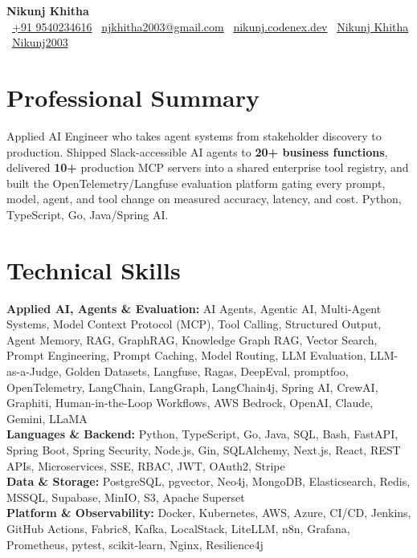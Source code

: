 \documentclass[letterpaper,10pt]{article}
\begin{document}
\begin{center}
  {\Huge \textbf{Nikunj Khitha}}\\
  \vspace{2pt}
  \small
  ~\href{tel:+919540234616}{+91 9540234616} \quad
  ~\href{mailto:njkhitha2003@gmail.com}{njkhitha2003@gmail.com} \quad
  ~\href{https://nikunj.codenex.dev/}{nikunj.codenex.dev} \quad
  ~\href{https://www.linkedin.com/in/nikunj-khitha/}{Nikunj Khitha} \quad
  ~\href{https://github.com/Nikunj2003}{Nikunj2003}
\end{center}

\section{Professional Summary}
\footnotesize Applied AI Engineer who takes agent systems from stakeholder discovery to production. Shipped Slack-accessible AI agents to \textbf{20+ business functions}, delivered \textbf{10+} production MCP servers into a shared enterprise tool registry, and built the OpenTelemetry/Langfuse evaluation platform gating every prompt, model, agent, and tool change on measured accuracy, latency, and cost. Python, TypeScript, Go, Java/Spring AI.

\section{Technical Skills}
\footnotesize
\textbf{Applied AI, Agents \& Evaluation:} AI Agents, Agentic AI, Multi-Agent Systems, Model Context Protocol (MCP), Tool Calling, Structured Output, Agent Memory, RAG, GraphRAG, Knowledge Graph RAG, Vector Search, Prompt Engineering, Prompt Caching, Model Routing, LLM Evaluation, LLM-as-a-Judge, Golden Datasets, Langfuse, Ragas, DeepEval, promptfoo, OpenTelemetry, LangChain, LangGraph, LangChain4j, Spring AI, CrewAI, Graphiti, Human-in-the-Loop Workflows, AWS Bedrock, OpenAI, Claude, Gemini, LLaMA\\
\textbf{Languages \& Backend:} Python, TypeScript, Go, Java, SQL, Bash, FastAPI, Spring Boot, Spring Security, Node.js, Gin, SQLAlchemy, Next.js, React, REST APIs, Microservices, SSE, RBAC, JWT, OAuth2, Stripe\\
\textbf{Data \& Storage:} PostgreSQL, pgvector, Neo4j, MongoDB, Elasticsearch, Redis, MSSQL, Supabase, MinIO, S3, Apache Superset\\
\textbf{Platform \& Observability:} Docker, Kubernetes, AWS, Azure, CI/CD, Jenkins, GitHub Actions, Fabric8, Kafka, LocalStack, LiteLLM, n8n, Grafana, Prometheus, pytest, scikit-learn, Nginx, Resilience4j
\end{document}
